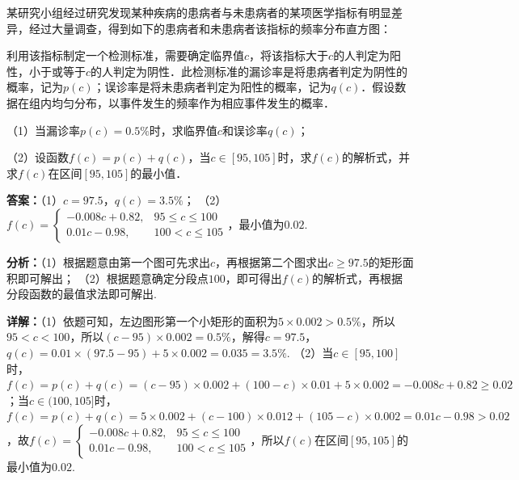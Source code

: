\begin{question}[points=10]
某研究小组经过研究发现某种疾病的患病者与未患病者的某项医学指标有明显差异，经过大量调查，得到如下的患病者和未患病者该指标的频率分布直方图：



利用该指标制定一个检测标准，需要确定临界值$c$，将该指标大于$c$的人判定为阳性，小于或等于$c$的人判定为阴性．此检测标准的漏诊率是将患病者判定为阴性的概率，记为$p(c)$；误诊率是将未患病者判定为阳性的概率，记为$q(c)$．假设数据在组内均匀分布，以事件发生的频率作为相应事件发生的概率．

（1）当漏诊率$p(c)=0.5\%$时，求临界值$c$和误诊率$q(c)$；

（2）设函数$f(c)=p(c)+q(c)$，当$c\in[95,105]$时，求$f(c)$的解析式，并求$f(c)$在区间$[95,105]$的最小值．
\begin{solution}
\textbf{答案：}（1）$c=97.5$，$q(c)=3.5\%$；
（2）$f(c)=\begin{cases}-0.008c+0.82, & 95\le c\le100\\ 0.01c-0.98, & 100<c\le105\end{cases}$，最小值为$0.02$.

\textbf{分析：}（1）根据题意由第一个图可先求出$c$，再根据第二个图求出$c\ge97.5$的矩形面积即可解出；
（2）根据题意确定分段点$100$，即可得出$f(c)$的解析式，再根据分段函数的最值求法即可解出.

\textbf{详解：}（1）依题可知，左边图形第一个小矩形的面积为$5\times0.002>0.5\%$，所以$95<c<100$，所以$(c-95)\times0.002=0.5\%$，解得$c=97.5$，$q(c)=0.01\times(97.5-95)+5\times0.002=0.035=3.5\%$.
（2）当$c\in[95,100]$时，$f(c)=p(c)+q(c)=(c-95)\times0.002+(100-c)\times0.01+5\times0.002=-0.008c+0.82\ge0.02$；当$c\in(100,105]$时，$f(c)=p(c)+q(c)=5\times0.002+(c-100)\times0.012+(105-c)\times0.002=0.01c-0.98>0.02$，故$f(c)=\begin{cases}-0.008c+0.82, & 95\le c\le100\\ 0.01c-0.98, & 100<c\le105\end{cases}$，所以$f(c)$在区间$[95,105]$的最小值为$0.02$.
\end{solution}
\end{question}

